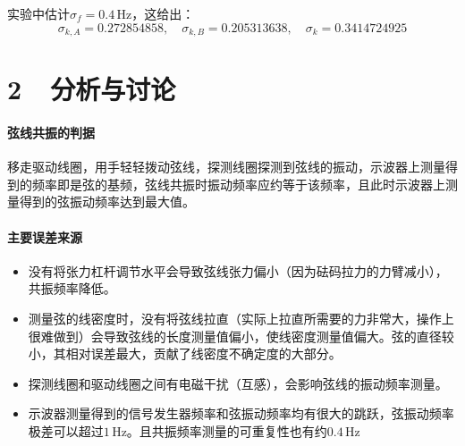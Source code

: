 \documentclass[a4paper,fontset=windows]{ctexart}
\begin{document}
实验中估计$\sigma_f = 0.4\,\mathrm{Hz}$，这给出：
\[
\sigma_{k,A} = 0.272854858,\quad \sigma_{k,B} = 0.205313638,\quad \sigma_k = 0.3414724925
\]

\newpage
\section*{2\ \ 分析与讨论}

\paragraph{弦线共振的判据}移走驱动线圈，用手轻轻拨动弦线，探测线圈探测到弦线的振动，示波器上测量得到的频率即是弦的基频，弦线共振时振动频率应约等于该频率，且此时示波器上测量得到的弦振动频率达到最大值。

\paragraph{主要误差来源}
\begin{itemize}
    \item 没有将张力杠杆调节水平会导致弦线张力偏小（因为砝码拉力的力臂减小），共振频率降低。
    
    \item 测量弦的线密度时，没有将弦线拉直（实际上拉直所需要的力非常大，操作上很难做到）会导致弦线的长度测量值偏小，使线密度测量值偏大。弦的直径较小，其相对误差最大，贡献了线密度不确定度的大部分。
    
    \item 探测线圈和驱动线圈之间有电磁干扰（互感），会影响弦线的振动频率测量。
    
    \item 示波器测量得到的信号发生器频率和弦振动频率均有很大的跳跃，弦振动频率极差可以超过$1\,\mathrm{Hz}$。且共振频率测量的可重复性也有约$0.4\,\mathrm{Hz}$
\end{itemize}
\end{document}
